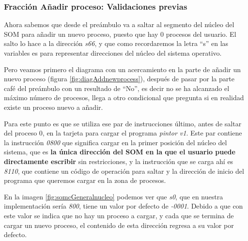 \documentclass[letterpaper,12pt,oneside]{book}
\begin{document}
            \subsubsection{Fracción Añadir proceso: Validaciones previas}
			Ahora sabemos que desde el preámbulo va a saltar al segmento del núcleo del SOM para añadir un nuevo proceso, puesto
			que hay 0 procesos del usuario. El salto lo hace a la dirección \textit{s66}, y que como recordaremos la letra ``s'' en las variables es para representar
			direcciones del núcleo del sistema operativo.
   
            Pero veamos
			primero el diagrama con un acercamiento en la parte de añadir un nuevo proceso (figura \ref{fig:diagAddnewprocess}), después
			de pasar por la parte café del preámbulo con un resultado de ``No'', es decir no se ha alcanzado el máximo número de procesos,
			llega a otro condicional que pregunta si en realidad existe un proceso nuevo a añadir.
   
            Para este punto es que
			se utiliza ese par de instrucciones último, antes de saltar del proceso 0, en la tarjeta para cargar el programa  \textit{pintor v1}.
			Este par contiene la instrucción \textit{0800} que significa cargar en la primer posición del núcleo del sistema, que es \textbf{la única
			dirección del SOM en la que el usuario puede directamente escribir} sin restricciones, y la instrucción que se carga ahí es \textit{8110}, que contiene
			un código de operación para saltar y la dirección de inicio del programa que queremos cargar en la zona de procesos.
   
            En la imagen \ref{fig:somcGeneralnucleo}
			podemos ver que \textit{s0}, que en nuestra implementación sería \textit{800}, tiene un valor por defecto de \textit{-0001}. Debido a que con este valor
			se indica que no hay un proceso a cargar, y cada que se termina de  cargar un nuevo proceso, el contenido de esta dirección regresa a su valor por defecto.
			
\end{document}
